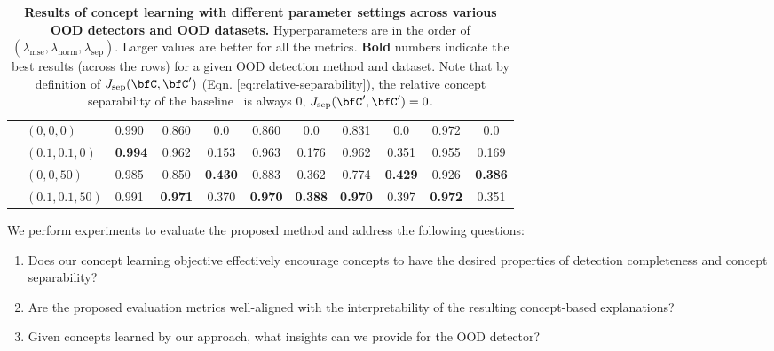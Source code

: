 \begin{table}[tb]
\begin{adjustbox}{width=1\columnwidth,center}
\begin{tabular}{l|l|l|c|c|c|c|c|c|c|c}
			& $(0, 0, 0)$ & 0.990 & 0.860 & 0.0 & 0.860 & 0.0 & 0.831 & 0.0 & 0.972 & 0.0 \\
			& $(0.1, 0.1, 0)$ & \textbf{0.994} & 0.962 & 0.153 & 0.963 & 0.176 & 0.962 & 0.351 & 0.955 & 0.169\\
			& $(0, 0, 50)$ & 0.985 & 0.850 & \textbf{0.430} & 0.883 & 0.362 & 0.774 & \textbf{0.429} & 0.926 & \textbf{0.386} \\
			& $(0.1, 0.1, 50)$ & 0.991 & \textbf{0.971} & 0.370 & \textbf{0.970} & \textbf{0.388} & \textbf{0.970} & 0.397 & \textbf{0.972} & 0.351 \\ \bottomrule
		\end{tabular}
	\end{adjustbox}
	\caption[]{\small \textbf{Results of concept learning with different parameter settings across various OOD detectors and OOD datasets.} 
	Hyperparameters are in the order of $(\lambda_\textrm{mse}, \lambda_\textrm{norm}, \lambda_\textrm{sep})$. Larger values are better for all the metrics. \textbf{Bold} numbers indicate the best results (across the rows) for a given OOD detection method and dataset. Note that by definition of $J_{\textrm{sep}}(\bfC, \bfC')$ (Eqn. \ref{eq:relative-separability}), the relative concept separability of the baseline~\citep{yeh2020completeness} is always $0$, \ie $J_{\textrm{sep}}(\bfC', \bfC') = 0$.}
	\label{tab:concept-learning-results}
\end{table}

\fi

\iffalse

We perform experiments to evaluate the proposed method and address the following questions:
\begin{enumerate}[start=1,label={\bfseries Q\arabic*.}]
    \item \label{Q1} Does our concept learning objective effectively encourage concepts to have the desired properties of detection completeness and concept separability?
    \item \label{Q2} Are the proposed evaluation metrics well-aligned with the interpretability of the resulting concept-based explanations?
    \item \label{Q3} Given concepts learned by our approach, what insights can we provide for the OOD detector?
\end{enumerate}


